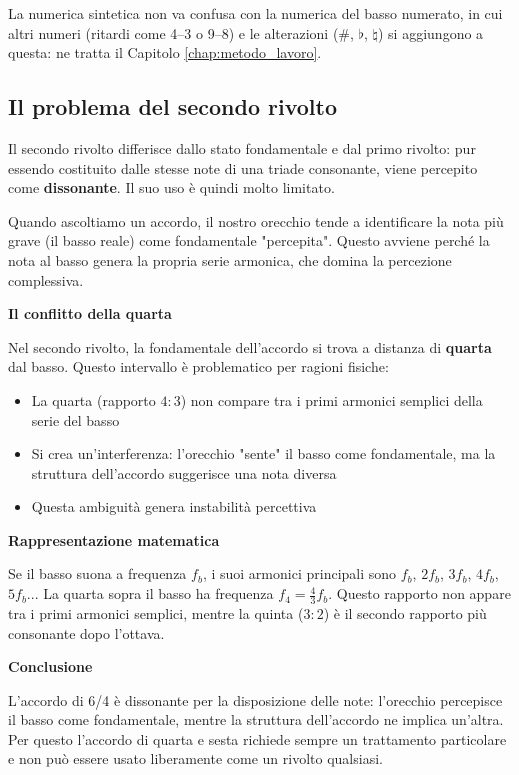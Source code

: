 La numerica sintetica non va confusa con la numerica del basso numerato, in cui altri numeri (ritardi come 4--3 o 9--8) e le alterazioni (\#, $\flat$, $\natural$) si aggiungono a questa: ne tratta il Capitolo \ref{chap:metodo_lavoro}.

\subsection{Il problema del secondo rivolto}
\label{subsec:problema_secondo_rivolto}

Il secondo rivolto differisce dallo stato fondamentale e dal primo rivolto: pur essendo costituito dalle stesse note di una triade consonante, viene percepito come \textbf{dissonante}. Il suo uso è quindi molto limitato.

\begin{fisica}
	\label{phys:conflitto_6_4}
	
	Quando ascoltiamo un accordo, il nostro orecchio tende a identificare la nota più grave (il basso reale) come fondamentale "percepita". Questo avviene perché la nota al basso genera la propria serie armonica, che domina la percezione complessiva.
	
	\textbf{Il conflitto della quarta}
	
	Nel secondo rivolto, la fondamentale dell'accordo si trova a distanza di \textbf{quarta} dal basso. Questo intervallo è problematico per ragioni fisiche:
	
	\begin{itemize}
		\item La quarta (rapporto $4:3$) non compare tra i primi armonici semplici della serie del basso
		\item Si crea un'interferenza: l'orecchio "sente" il basso come fondamentale, ma la struttura dell'accordo suggerisce una nota diversa
		\item Questa ambiguità genera instabilità percettiva
	\end{itemize}
	
	\textbf{Rappresentazione matematica}
	
	Se il basso suona a frequenza $f_b$, i suoi armonici principali sono $f_b$, $2f_b$, $3f_b$, $4f_b$, $5f_b$... La quarta sopra il basso ha frequenza $f_4 = \frac{4}{3}f_b$. Questo rapporto non appare tra i primi armonici semplici, mentre la quinta ($3:2$) è il secondo rapporto più consonante dopo l'ottava.
	
	\textbf{Conclusione}
	
	L'accordo di 6/4 è dissonante per la disposizione delle note: l'orecchio percepisce il basso come fondamentale, mentre la struttura dell'accordo ne implica un'altra. Per questo l'accordo di quarta e sesta richiede sempre un trattamento particolare e non può essere usato liberamente come un rivolto qualsiasi.
\end{fisica}


